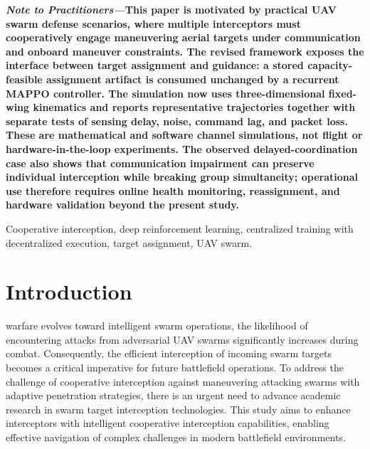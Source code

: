 \documentclass[lettersize,journal]{IEEEtran}
\begin{document}
{\linespread{0.9}\selectfont
\hspace*{0.0em}\textbf{\textit{Note to Practitioners—}}\textbf{This paper is motivated by practical UAV swarm defense scenarios, where multiple interceptors must cooperatively engage maneuvering aerial targets under communication and onboard maneuver constraints. The revised framework exposes the interface between target assignment and guidance: a stored capacity-feasible assignment artifact is consumed unchanged by a recurrent MAPPO controller. The simulation now uses three-dimensional fixed-wing kinematics and reports representative trajectories together with separate tests of sensing delay, noise, command lag, and packet loss. These are mathematical and software channel simulations, not flight or hardware-in-the-loop experiments. The observed delayed-coordination case also shows that communication impairment can preserve individual interception while breaking group simultaneity; operational use therefore requires online health monitoring, reassignment, and hardware validation beyond the present study.}\par\vspace{0.5\baselineskip}
}

\begin{IEEEkeywords}
Cooperative interception, deep reinforcement learning, centralized training with decentralized
execution, target assignment, UAV swarm.
\end{IEEEkeywords}


\section{Introduction}
\label{sec:introduction}
 warfare evolves toward intelligent swarm operations, the likelihood of
encountering attacks from adversarial UAV swarms significantly increases during combat.
Consequently, the efficient interception of incoming swarm targets becomes a critical
imperative for future battlefield operations.
To address the challenge of cooperative interception against maneuvering attacking swarms with
adaptive penetration strategies, there is an urgent need to advance academic research in swarm
target interception technologies.
This study aims to enhance interceptors with intelligent cooperative interception capabilities,
enabling effective navigation of complex challenges in modern battlefield environments.
\end{document}
